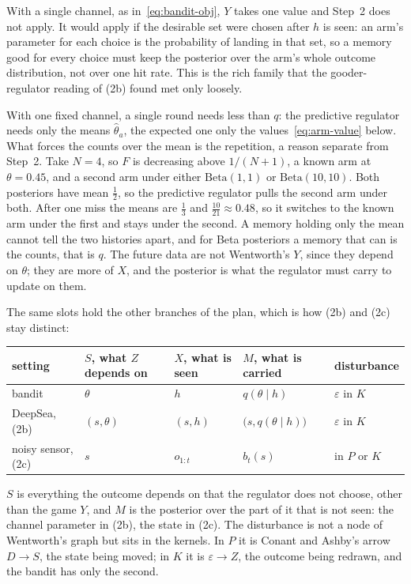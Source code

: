 \documentclass[11pt]{article}
\theoremstyle{remark}
\newcommand{\1}{\mathds{1}}
\begin{document}
With a single channel, as in~\eqref{eq:bandit-obj}, $Y$ takes one value and Step~2 does not apply.
It would apply if the desirable set were chosen after $h$ is seen: an arm's parameter for each choice is the probability of landing in that set, so a memory good for every choice must keep the posterior over the arm's whole outcome distribution, not over one hit rate.
This is the rich family that the gooder-regulator reading of (2b) found met only loosely.

With one fixed channel, a single round needs less than $q$: the predictive regulator needs only the means $\hat\theta_a$, the expected one only the values~\eqref{eq:arm-value} below.
What forces the counts over the mean is the repetition, a reason separate from Step~2.
Take $N=4$, so $F$ is decreasing above $1/(N+1)$, a known arm at $\theta=0.45$, and a second arm under either $\mathrm{Beta}(1,1)$ or $\mathrm{Beta}(10,10)$.
Both posteriors have mean $\tfrac12$, so the predictive regulator pulls the second arm under both.
After one miss the means are $\tfrac13$ and $\tfrac{10}{21}\approx0.48$, so it switches to the known arm under the first and stays under the second.
A memory holding only the mean cannot tell the two histories apart, and for Beta posteriors a memory that can is the counts, that is $q$.
The future data are not Wentworth's $Y$, since they depend on $\theta$; they are more of $X$, and the posterior is what the regulator must carry to update on them.

The same slots hold the other branches of the plan, which is how (2b) and (2c) stay distinct:
\begin{center}
\begin{tabular}{lllll}
\toprule
setting & $S$, what $Z$ depends on & $X$, what is seen & $M$, what is carried & disturbance \\
\midrule
bandit & $\theta$ & $h$ & $q(\theta\mid h)$ & $\varepsilon$ in $K$ \\
DeepSea, (2b) & $(s,\theta)$ & $(s,h)$ & $\big(s,q(\theta\mid h)\big)$ & $\varepsilon$ in $K$ \\
noisy sensor, (2c) & $s$ & $o_{1:t}$ & $b_t(s)$ & in $P$ or $K$ \\
\bottomrule
\end{tabular}
\end{center}
$S$ is everything the outcome depends on that the regulator does not choose, other than the game $Y$, and $M$ is the posterior over the part of it that is not seen: the channel parameter in (2b), the state in (2c).
The disturbance is not a node of Wentworth's graph but sits in the kernels.
In $P$ it is Conant and Ashby's arrow $D\to S$, the state being moved; in $K$ it is $\varepsilon\to Z$, the outcome being redrawn, and the bandit has only the second.
\end{document}
